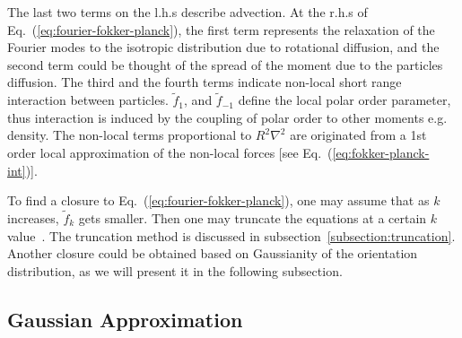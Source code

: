 \documentclass[reprint,floatfix,amsmath,amssymb,aps,pre,showkeys,showpacs,superscriptaddress]{revtex4-1}
\newcommand{\req}[1]{Eq.~(\ref{#1})}
\begin{document}
The last two terms on the l.h.s describe advection. At the r.h.s of \req{eq:fourier-fokker-planck}, the first term represents the relaxation of the Fourier modes to the isotropic distribution due to rotational diffusion, and the second term could be thought of the spread of the moment due to the particles diffusion. The third and the fourth terms indicate non-local short range interaction between particles. $\tilde{f}_1$, and $\tilde{f}_{-1}$ define the local polar order parameter, thus interaction is induced by the coupling of polar order to other moments e.g. density. The non-local terms proportional to $R^2 \nabla^2$ are originated from a 1st order local approximation of the non-local forces [see \req{eq:fokker-planck-int}].



To find a closure to \req{eq:fourier-fokker-planck}, one may assume that as $k$ increases, $\tilde{f}_k$ gets smaller. Then one may truncate the equations at a certain $k$ value~\cite{Bertin2006,Bertin2009,Peshkov2012,Peshkov2012continuous}. The truncation method is discussed in subsection~\ref{subsection:truncation}.  Another closure could be obtained based on Gaussianity of the orientation distribution, as we will present it in the following subsection.

\subsection{Gaussian Approximation}
\label{subsection:GA}
\end{document}
